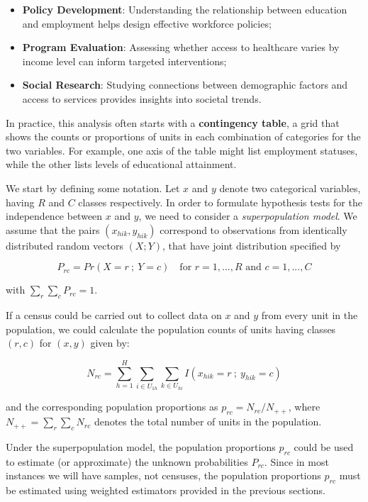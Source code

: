 \documentclass[
  12pt,
]{book}
\begin{document}
\begin{itemize}
\item
  \textbf{Policy Development}: Understanding the relationship between education and employment helps design effective workforce policies;
\item
  \textbf{Program Evaluation}: Assessing whether access to healthcare varies by income level can inform targeted interventions;
\item
  \textbf{Social Research}: Studying connections between demographic factors and access to services provides insights into societal trends.
\end{itemize}

In practice, this analysis often starts with a \textbf{contingency table}, a grid that shows the counts or proportions of units in each combination of categories for the two variables. For example, one axis of the table might list employment statuses, while the other lists levels of educational attainment.

We start by defining some notation. Let \(x\) and \(y\) denote two categorical variables, having \(R\) and \(C\) classes respectively. In order to formulate hypothesis tests for the independence between \(x\) and \(y\), we need to consider a \emph{superpopulation model}. We assume that the pairs \((x_{hik} , y_{hik})\) correspond to observations from identically distributed random vectors \((X ; Y)\), that have joint distribution specified by

\[
P_{rc} = Pr \left( X = r \ ; \ Y = c \right) \quad \text{for } r=1,...,R \text{ and } c=1,...,C
\]

with \(\sum_r \sum_c P_{rc} = 1\).

If a census could be carried out to collect data on \(x\) and \(y\) from every unit in the population, we could calculate the population counts of units having classes \((r,c)\) for \((x,y)\) given by:

\[
N_{rc} = \sum_{h=1}^H \sum_{i \in U_{1h}} \sum_{k \in U_{hi}} I \left( x_{hik} = r \ ; \ y_{hik} = c \right)
\]

and the corresponding population proportions as \(p_{rc} = N_{rc} / N_{++}\), where \(N_{++} = \sum_r \sum_c N_{rc}\) denotes the total number of units in the population.

Under the superpopulation model, the population proportions \(p_{rc}\) could be used to estimate (or approximate) the unknown probabilities \(P_{rc}\). Since in most instances we will have samples, not censuses, the population proportions \(p_{rc}\) must be estimated using weighted estimators provided in the previous sections.
\end{document}
